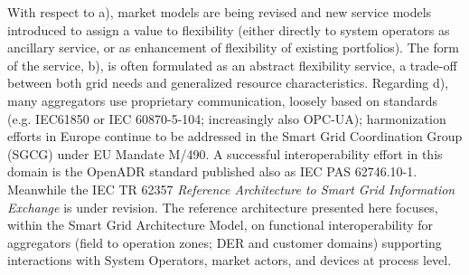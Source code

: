 With respect to a), market models are being revised and new service models introduced to assign a value to flexibility (either directly to system operators as ancillary service, or as enhancement of flexibility of existing portfolios). The form of the service, b), is often formulated as an abstract flexibility service, a trade-off between both grid needs and generalized resource characteristics. Regarding d), many aggregators use proprietary communication, loosely based on standards (e.g. IEC61850 or IEC 60870-5-104; increasingly also OPC-UA); harmonization efforts in Europe continue to be addressed in the Smart Grid Coordination Group (SGCG) under EU Mandate M/490. A successful interoperability effort in this domain is the OpenADR standard published also as IEC PAS 62746.10-1. Meanwhile the IEC TR 62357 \emph{Reference Architecture to Smart Grid Information Exchange} is under revision. The reference architecture presented here focuses, within the Smart Grid Architecture Model\cite{SGAM}, on functional interoperability for aggregators (field to operation zones; DER and customer domains) supporting interactions with System Operators, market actors, and devices at process level.

